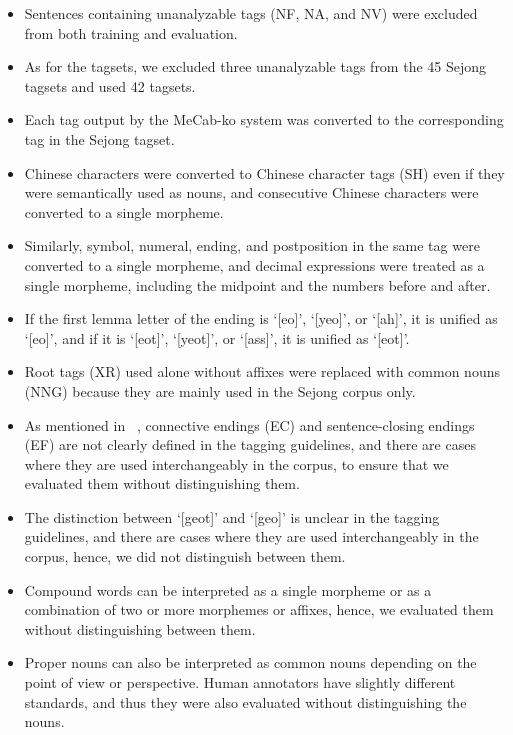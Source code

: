 \documentclass[AMS,STIX2COL]{WileyNJD-v2}
\begin{document}
    \begin{itemize}
        \item Sentences containing unanalyzable tags (NF, NA, and NV) were excluded from both training and evaluation.
        \item As for the tagsets, we excluded three unanalyzable tags from the 45 Sejong tagsets and used 42 tagsets.
        \item Each tag output by the MeCab-ko system was converted to the corresponding tag in the Sejong tagset.
        \item Chinese characters were converted to Chinese character tags (SH) even if they were semantically used as nouns, and consecutive Chinese characters were converted to a single morpheme.
        \item Similarly, symbol, numeral, ending, and postposition in the same tag were converted to a single morpheme, and decimal expressions were treated as a single morpheme, including the midpoint and the numbers before and after.
        \item If the first lemma letter of the ending is `[eo]', `[yeo]', or `[ah]', it is unified as `[eo]', and if it is `[eot]', `[yeot]', or `[ass]', it is unified as `[eot]'. %
        \item Root tags (XR) used alone without affixes were replaced with common nouns (NNG) because they are mainly used in the Sejong corpus only.
        \item As mentioned in ~\cite{KimIH2010}, connective endings (EC) and sentence-closing endings (EF) are not clearly defined in the tagging guidelines, and there are cases where they are used interchangeably in the corpus, to ensure that we evaluated them without distinguishing them.
        \item The distinction between `[geot]' and `[geo]' is unclear in the tagging guidelines, and there are cases where they are used interchangeably in the corpus, hence, we did not distinguish between them. %
        \item Compound words can be interpreted as a single morpheme or as a combination of two or more morphemes or affixes, hence, we evaluated them without distinguishing between them.
        \item Proper nouns can also be interpreted as common nouns depending on the point of view or perspective. Human annotators have slightly different standards, and thus they were also evaluated without distinguishing the nouns.
    \end{itemize}
\end{document}
